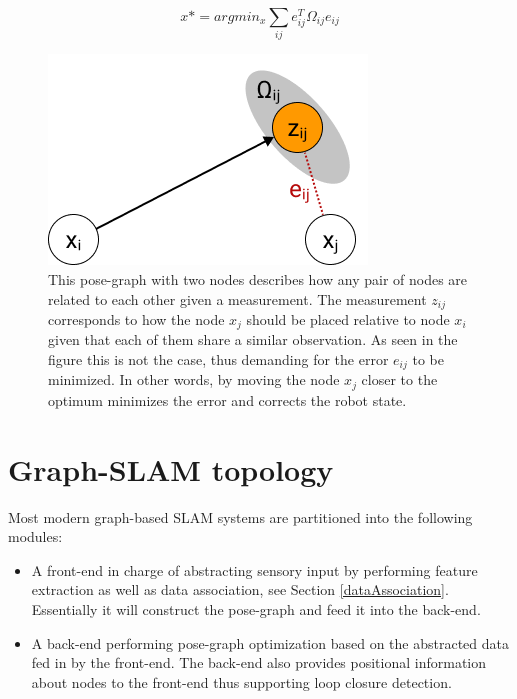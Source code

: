 \begin{equation}\label{leastSquares}
	x* = argmin_{x} \sum_{ij}e_{ij}^{T} \Omega_{ij} e_{ij}
\end{equation}


\begin{figure}
	\centering
	\includegraphics[width=0.4\linewidth]{img/PoseGraphOptimization}
	\caption{
		This pose-graph with two nodes describes how any pair of nodes are related to each other given a measurement. The measurement $ z_{ij} $ corresponds to how the node $x_{j}$ should be placed relative to node $x_{i}$ given that each of them share a similar observation. As seen in the figure this is not the case, thus demanding for the error $e_{ij}$ to be minimized. In other words, by moving the node $x_{j}$ closer to the optimum minimizes the error and corrects the robot state. 
	}
	\label{fig:poseGraphOptimization}
\end{figure}


\section{Graph-SLAM topology}
Most modern graph-based SLAM systems are partitioned into the following modules:
\begin{itemize}
	\item A front-end in charge of abstracting sensory input by performing feature extraction as well as data association, see Section \ref{dataAssociation}. Essentially it will construct the pose-graph and feed it into the back-end.
	\item A back-end performing pose-graph optimization based on the abstracted data fed in by the front-end. The back-end also provides positional information about nodes to the front-end thus supporting loop closure detection. 
\end{itemize}

